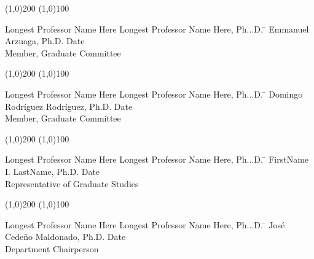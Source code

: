   \noindent
\line(1,0){200} \hspace{40 mm} \line(1,0){100}\\
  \noindent
\vspace{-1.75\baselineskip}
  \begin{tabbing}
Longest Professor Name Here Longest Professor Name Here, Ph...D.  \=  \kill 
Emmanuel Arzuaga, Ph.D. \>  Date\\Member, Graduate Committee
\end{tabbing}


  \noindent
\line(1,0){200} \hspace{40 mm} \line(1,0){100}\\
  \noindent
\vspace{-1.75\baselineskip}
  \begin{tabbing}
Longest Professor Name Here Longest Professor Name Here, Ph...D.  \=  \kill 
Domingo Rodríguez Rodríguez, Ph.D. \>  Date\\Member, Graduate Committee
\end{tabbing}



  \noindent
\line(1,0){200} \hspace{40 mm} \line(1,0){100}\\
  \noindent
\vspace{-1.75\baselineskip}
  \begin{tabbing}
Longest Professor Name Here Longest Professor Name Here, Ph...D.  \=  \kill 
FirstName I. LastName, Ph.D. \>  Date\\Representative of Graduate Studies  %
\end{tabbing}


  \noindent
  \line(1,0){200} \hspace{40 mm} \line(1,0){100}\\
  \noindent
\vspace{-1.75\baselineskip}
  \begin{tabbing}
Longest Professor Name Here Longest Professor Name Here, Ph...D.  \=  \kill 
José Cedeño Maldonado, Ph.D. \>  Date\\Department Chairperson  %
\end{tabbing}